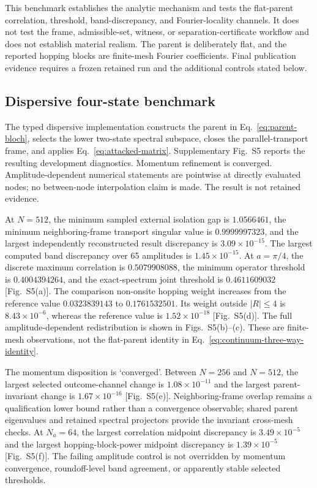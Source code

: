 \documentclass[aps,prb,reprint,amsmath,amssymb,longbibliography,floatfix]{revtex4-2}
\makeatletter
\def\label#1{\@bsphack
  \begingroup
  \UseHookWithArguments{label}{1}{#1}%
  \protected@write\@auxout{}%
    {\string\newlabel{#1}{{\@currentlabel}{\thepage}{\@currentlabelname}%
      {\@currentHref}{\@kernel@reserved@label@data}}}%
  \endgroup
  \@esphack}
\makeatother
\begin{document}
This benchmark establishes the analytic mechanism and tests the flat-parent correlation,
threshold, band-discrepancy, and Fourier-locality channels. It does not test the frame,
admissible-set, witness, or separation-certificate workflow and does not establish
material realism. The parent is deliberately flat, and the reported hopping blocks are
finite-mesh Fourier coefficients. Final publication evidence requires a frozen retained
run and the additional controls stated below.

\subsection{Dispersive four-state benchmark}
\label{sec:nonflat-exploratory}

The typed dispersive implementation constructs the parent in
Eq.~\eqref{eq:parent-bloch}, selects the lower two-state spectral subspace, closes the
parallel-transport frame, and applies Eq.~\eqref{eq:attacked-matrix}.
Supplementary Fig.~S5 reports the resulting development diagnostics.
Momentum refinement is converged. Amplitude-dependent numerical statements are
pointwise at directly evaluated nodes; no between-node interpolation claim is made. The
result is not retained evidence.

At $N=512$, the minimum sampled external isolation gap is $1.0566461$, the minimum neighboring-frame
transport singular value is $0.9999997323$, and the largest independently reconstructed
result discrepancy is $3.09\times10^{-15}$. The largest computed band discrepancy over 65
amplitudes is $1.45\times10^{-15}$. At $a=\pi/4$, the discrete maximum correlation is
$0.5079908088$, the minimum operator threshold is $0.4004394264$, and the exact-spectrum
joint threshold is $0.4611609032$ [Fig.~S5(a)]. The comparison
non-onsite hopping weight increases from the reference value $0.0323839143$ to
$0.1761532501$. Its weight outside $|R|\le4$ is $8.43\times10^{-6}$, whereas the
reference value is $1.52\times10^{-18}$ [Fig.~S5(d)]. The full
amplitude-dependent redistribution is shown in
Figs.~S5(b)--(c). These are
finite-mesh observations, not the flat-parent identity in
Eq.~\eqref{eq:continuum-three-way-identity}.

The momentum disposition is `converged'. Between $N=256$ and $N=512$, the largest
selected outcome-channel change is $1.08\times10^{-11}$ and the largest
parent-invariant change is $1.67\times10^{-16}$
[Fig.~S5(e)]. Neighboring-frame overlap remains a qualification
lower bound rather than a convergence observable; shared parent eigenvalues and retained
spectral projectors provide the invariant cross-mesh checks. At $N_a=64$, the
largest correlation midpoint discrepancy is $3.49\times10^{-5}$ and the largest
hopping-block-power midpoint discrepancy is $1.39\times10^{-5}$
[Fig.~S5(f)]. The failing amplitude control is not overridden by
momentum convergence, roundoff-level band agreement, or apparently stable selected
thresholds.
\end{document}
